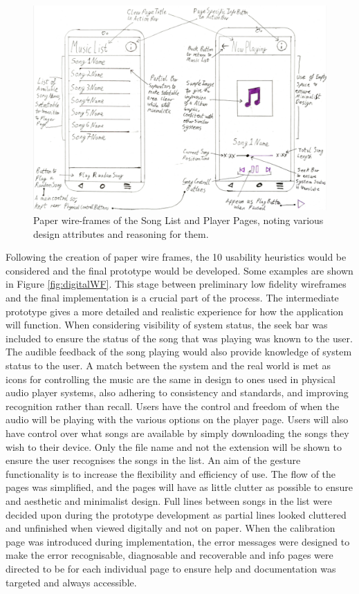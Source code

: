 \documentclass{l4proj}
\begin{document}
\begin{figure}[!htb]
    \centering
    \includegraphics[scale=0.0675]{images/papWF.jpg}
        \caption{Paper wire-frames of the Song List and Player Pages, noting various design attributes and reasoning for them.}
        \label{fig:paperWF}
\end{figure}

Following the creation of paper wire frames, the 10 usability heuristics would be considered and the final prototype would be developed. Some examples are shown in Figure \ref{fig:digitalWF}. This stage between preliminary low fidelity wireframes and the final implementation is a crucial part of the process. The intermediate prototype gives a more detailed and realistic experience for how the application will function. When considering visibility of system status, the seek bar was included to ensure the status of the song that was playing was known to the user. The audible feedback of the song playing would also provide knowledge of system status to the user. A match between the system and the real world is met as icons for controlling the music are the same in design to ones used in physical audio player systems, also adhering to consistency and standards, and improving recognition rather than recall. Users have the control and freedom of when the audio will be playing with the various options on the player page. Users will also have control over what songs are available by simply downloading the songs they wish to their device. Only the file name and not the extension will be shown to ensure the user recognises the songs in the list. An aim of the gesture functionality is to increase the flexibility and efficiency of use. The flow of the pages was simplified, and the pages will have as little clutter as possible to ensure and aesthetic and minimalist design. Full lines between songs in the list were decided upon during the prototype development as partial lines looked cluttered and unfinished when viewed digitally and not on paper. When the calibration page was introduced during implementation, the error messages were designed to make the error recognisable, diagnosable and recoverable and info pages were directed to be for each individual page to ensure help and documentation was targeted and always accessible.
\end{document}
